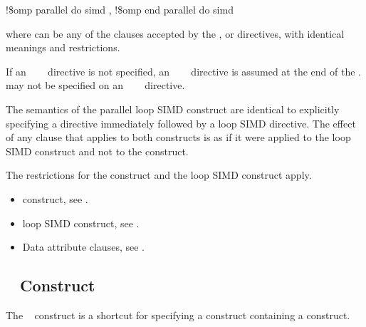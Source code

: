 \begin{samepage}
\fortranspecificstart
\begin{boxedcode}
!\$omp parallel do simd \plc{[clause[ [},\plc{] clause] ... ]}
!\$omp end parallel do simd
\end{boxedcode}
\end{samepage}

where  can be any of the clauses accepted by the ,  or  
directives, with identical meanings and restrictions.

\begin{samepage}
If an ~~~ directive is not specified, an 
~~~ directive is assumed at the end of the 
.  may not be specified on 
an ~~~ directive.
\fortranspecificend
\end{samepage}

\descr
The semantics of the parallel loop SIMD construct are identical to explicitly specifying 
a  directive immediately followed by a loop SIMD directive. The effect of 
any clause that applies to both constructs is as if it were applied to the loop SIMD 
construct and not to the  construct.

\restrictions
The restrictions for the  construct and the loop SIMD construct apply.

\crossreferences
\begin{itemize}
\item {} construct, see 
.

\item loop SIMD construct, see 
.

\item Data attribute clauses, see 
. 
\end{itemize}










\subsection{~ Construct}
\label{subsec:target teams construct}
\summary
The ~ construct is a shortcut for specifying a  construct 
containing a  construct.

